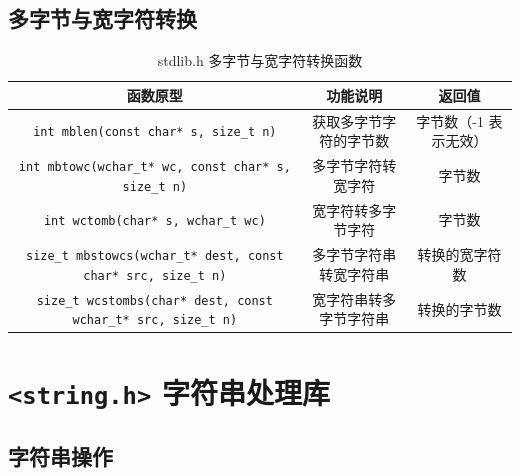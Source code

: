 \subsection{多字节与宽字符转换}

\begin{table}[H]
\centering
\small
\renewcommand{\arraystretch}{1.5}
\begin{tabulary}{\linewidth}{CCC}
\toprule
\textbf{函数原型} & \textbf{功能说明} & \textbf{返回值} \\ \midrule
\texttt{int mblen(const char* s, size\_t n)} & 获取多字节字符的字节数 & 字节数（-1 表示无效） \\ 
\texttt{int mbtowc(wchar\_t* wc, const char* s, size\_t n)} & 多字节字符转宽字符 & 字节数 \\ 
\texttt{int wctomb(char* s, wchar\_t wc)} & 宽字符转多字节字符 & 字节数 \\ 
\texttt{size\_t mbstowcs(wchar\_t* dest, const char* src, size\_t n)} & 多字节字符串转宽字符串 & 转换的宽字符数 \\ 
\texttt{size\_t wcstombs(char* dest, const wchar\_t* src, size\_t n)} & 宽字符串转多字节字符串 & 转换的字节数 \\ \bottomrule
\end{tabulary}
\caption{stdlib.h 多字节与宽字符转换函数}
\label{tab:stdlib_mb}
\end{table}

\section{\texorpdfstring{\texttt{<string.h>} 字符串处理库}{<string.h> 字符串处理库}}

\subsection{字符串操作}

